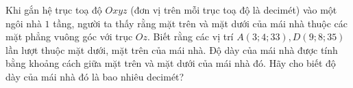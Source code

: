 \begin{ex}%
	Khi gắn hệ trục toạ độ $Oxyz$ (đơn vị trên mỗi trục toạ độ là decimét) vào một ngôi nhà $1$ tầng, người ta thấy rằng mặt trên và mặt dưới của mái nhà thuộc các mặt phẳng vuông góc với trục $Oz$. Biết rằng các vị trí $A(3;4;33), D(9;8;35)$ lần lượt thuộc mặt dưới, mặt trên của mái nhà. Độ dày của mái nhà được tính bằng khoảng cách giữa mặt trên và mặt dưới của mái nhà đó. Hãy cho biết độ dày của mái nhà đó là bao nhiêu decimét?
\end{ex}

